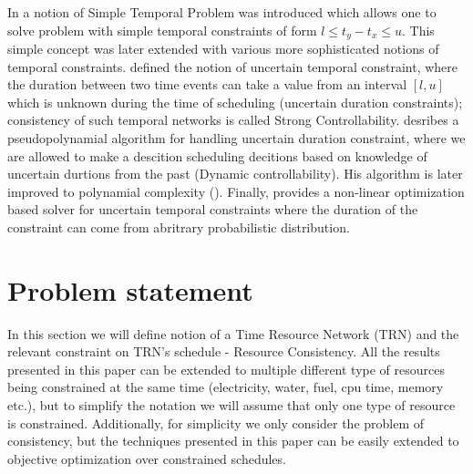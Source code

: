 \documentclass{article}
\begin{document}
\begin{multicols}{2}
In \cite{dechter1991temporal} a notion of Simple Temporal Problem was introduced which allows one to solve problem with simple temporal constraints of form $l \leq t_y - t_x \leq u$. This simple concept was later extended with various more sophisticated notions of temporal constraints. \cite{vidal1996dealing} defined the notion of uncertain temporal constraint, where the duration between two time events can take a value from an interval $[l,u]$ which is unknown during the time of scheduling (uncertain duration constraints); consistency of such temporal networks is called Strong Controllability. \cite{morris2001dynamic} desribes a pseudopolynamial algorithm for handling uncertain duration constraint, where we are allowed to make a descition scheduling decitions based on knowledge of uncertain durtions from the past (Dynamic controllability). His algorithm is later improved to polynamial complexity (\cite{morris2005temporal}). Finally, \cite{Fang2014} provides a non-linear optimization based solver for uncertain temporal constraints where the duration of the constraint can come from abritrary probabilistic distribution.

\section{Problem statement}
In this section we will define notion of a Time Resource Network (TRN) and the relevant constraint on TRN's schedule - Resource Consistency. All the results presented in this paper can be extended to multiple different type of resources being constrained at the same time (electricity, water, fuel, cpu time, memory etc.), but to simplify the notation we will assume that only one type of resource is constrained. Additionally, for simplicity we only consider the problem of consistency, but the techniques presented in this paper can be easily extended to objective optimization over constrained schedules.

\end{multicols}
\end{document}
